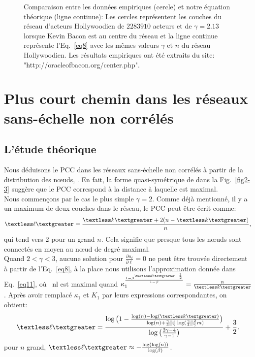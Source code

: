 \begin{figure}[h!]
	\caption{Comparaison entre les données empiriques (cercle) et notre équation théorique (ligne continue): Les cercles représentent les couches du réseau d’acteurs Hollywoodien de $2283910$ acteurs et de $\gamma=2.13$ lorsque Kevin Bacon est au centre du réseau et la ligne continue représente l'Eq.~\eqref{eq8} avec les mêmes valeurs $\gamma$ et $n$ du réseau Hollywoodien. Les résultats empiriques ont été extraits du site: "http://oracleofbacon.org/center.php".}	
	\label{couch-reel}
\end{figure}
    
\section{Plus court chemin dans les réseaux sans-échelle non corrélés }
   \subsection{L'étude théorique}
   \label{pcc}
   Nous déduisons le PCC dans les réseaux sans-échelle non corrélés à partir de la distribution des nœuds, \nl. En fait, la forme quasi-symétrique de \nl dans la Fig.~\ref{fig2-3} suggère que le PCC correspond à la distance à laquelle \nl est maximal. \\ Nous commençons par le cas le plus simple $\gamma=2$. Comme déjà mentionné, il y a un maximum de deux couches dans le réseau, le PCC peut être écrit comme:
   \begin{align}
   	\textless \ell \textgreater=\frac{\km+2(n-\km)}{n},
   	\label{eq14}  
   \end{align}
qui tend vers $2$ pour un grand $n$. Cela signifie que presque tous les nœuds sont connectés en moyen au nœud de degré maximal. \\
Quand $ 2<\gamma<3 $, aucune solution pour $\frac{\partial n_{\ell}}{\partial\ell}=0$ ne peut être trouvée directement à partir de l'Eq.~\eqref{eq8}, à la place nous utilisons l'approximation donnée dans Eq.~\eqref{eq11}, où \ nl est maximal quand $\kappa_1^{\frac{1-\beta^{\textless \ell \textgreater-\frac{3}{2}}}{1-\beta}}=\frac{n}{\km}$. Après avoir remplacé $\kappa_1 $ et $K_1$ par leurs expressions correspondantes, on obtient:
\begin{align}
	\textless \ell \textgreater=\frac{\log\big(1-\frac{\log(n)-\log(\km)}{\log(n)+\frac{\gamma-1}{3-\gamma}\log(\frac{\gamma-2}{3-\gamma}m)}\big)}{\log\big(\frac{2\gamma-4}{\gamma-1}\big)}+\frac{3}{2}.
	\label{eq12}
\end{align}
pour $n$ grand, $\textless \ell \textgreater \approx -\frac{\log(\log(n))}{\log(\beta)}$.
